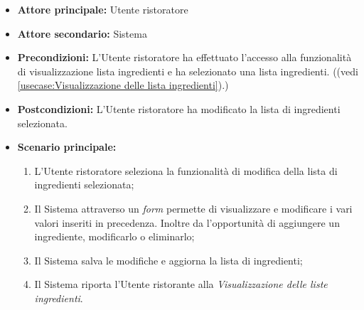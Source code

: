 \label{usecase:Modifica di una lista ingredienti}
\begin{itemize}
	\item \textbf{Attore principale:} Utente ristoratore
	
	\item \textbf{Attore secondario:} Sistema

	\item \textbf{Precondizioni:} L'Utente ristoratore ha effettuato l'accesso
	alla funzionalità di visualizzazione lista ingredienti e ha selezionato una lista ingredienti.
	((vedi \autoref{usecase:Visualizzazione delle lista ingredienti}).)

	\item \textbf{Postcondizioni:}
	      L'Utente ristoratore ha modificato la lista di ingredienti selezionata.

	\item \textbf{Scenario principale:}
	      \begin{enumerate}
		      \item L'Utente ristoratore seleziona la funzionalità di
		            modifica della lista di ingredienti selezionata;

		      \item Il Sistema attraverso un \textit{form} permette di visualizzare e modificare i vari valori inseriti in precedenza.
					Inoltre da l'opportunità di aggiungere un ingrediente, modificarlo o eliminarlo;
				
			  \item Il Sistema salva le modifiche e aggiorna la lista di ingredienti;
			  
			  \item Il Sistema riporta l'Utente ristorante alla \textit{Visualizzazione delle liste ingredienti}.
	      \end{enumerate}
\end{itemize}
